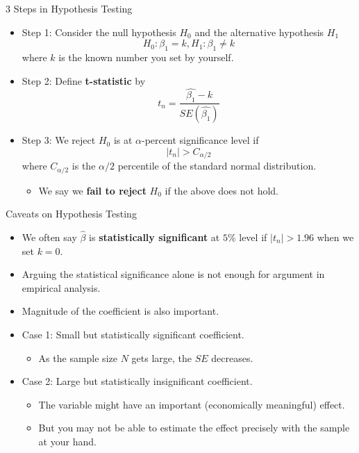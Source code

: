 \documentclass[
  ignorenonframetext,
]{beamer}
\providecommand{\tightlist}{%
  \setlength{\itemsep}{0pt}\setlength{\parskip}{0pt}}
\begin{document}
\begin{frame}{3 Steps in Hypothesis Testing}
\protect\hypertarget{steps-in-hypothesis-testing}{}

\begin{itemize}
\item
  Step 1: Consider the null hypothesis \(H_{0}\) and the alternative
  hypothesis \(H_{1}\) \[
    H_{0}:\beta_{1}=k,H_{1}:\beta_{1}\neq k
    \] where \(k\) is the known number you set by yourself.
\item
  Step 2: Define \textbf{t-statistic} by \[
    t_{n}=\frac{\hat{\beta_1}-k}{SE(\hat{\beta_1})}
    \]
\item
  Step 3: We reject \(H_{0}\) is at \(\alpha\)-percent significance
  level if \[|t_{n}|>C_{\alpha/2} 
  \] where \(C_{\alpha/2}\) is the \(\alpha/2\) percentile of the
  standard normal distribution.

  \begin{itemize}
  \tightlist
  \item
    We say we \textbf{fail to reject} \(H_0\) if the above does not
    hold.
  \end{itemize}
\end{itemize}

\end{frame}

\begin{frame}{Caveats on Hypothesis Testing}
\protect\hypertarget{caveats-on-hypothesis-testing}{}

\begin{itemize}
\tightlist
\item
  We often say \(\hat{\beta}\) is \textbf{statistically significant} at
  \(5\%\) level if \(|t_{n}|>1.96\) when we set \(k=0\).
\item
  Arguing the statistical significance alone is not enough for argument
  in empirical analysis.
\item
  Magnitude of the coefficient is also important.
\item
  Case 1: Small but statistically significant coefficient.

  \begin{itemize}
  \tightlist
  \item
    As the sample size \(N\) gets large, the \(SE\) decreases.
  \end{itemize}
\item
  Case 2: Large but statistically insignificant coefficient.

  \begin{itemize}
  \tightlist
  \item
    The variable might have an important (economically meaningful)
    effect.
  \item
    But you may not be able to estimate the effect precisely with the
    sample at your hand.
  \end{itemize}
\end{itemize}

\end{frame}
\end{document}

